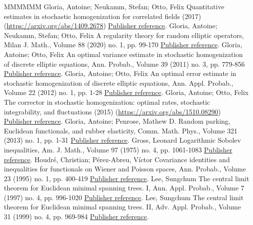 \begin{thebibliography}{MMMMMM}
 Gloria, Antoine; Neukamm, Stefan; Otto, Felix Quantitative estimates in stochastic homogenization for correlated fields (2017) (\url{https://arxiv.org/abs/1409.2678}) \href{https://ahl.centre-mersenne.org/item/AHL_2020__3__825_0/#GNO-quant}{Publisher reference}.
 Gloria, Antoine; Neukamm, Stefan; Otto, Felix A regularity theory for random elliptic operators, Milan J. Math., Volume 88 (2020) no. 1, pp. 99-170 \href{https://ahl.centre-mersenne.org/item/AHL_2020__3__825_0/#GNO-reg}{Publisher reference}.
 Gloria, Antoine; Otto, Felix An optimal variance estimate in stochastic homogenization of discrete elliptic equations, Ann. Probab., Volume 39 (2011) no. 3, pp. 779-856 \href{https://ahl.centre-mersenne.org/item/AHL_2020__3__825_0/#Glotto-11}{Publisher reference}.
 Gloria, Antoine; Otto, Felix An optimal error estimate in stochastic homogenization of discrete elliptic equations, Ann. Appl. Probab., Volume 22 (2012) no. 1, pp. 1-28 \href{https://ahl.centre-mersenne.org/item/AHL_2020__3__825_0/#Glotto-12}{Publisher reference}.
 Gloria, Antoine; Otto, Felix The corrector in stochastic homogenization: optimal rates, stochastic integrability, and fluctuations (2015) (\url{https://arxiv.org/abs/1510.08290}) \href{https://ahl.centre-mersenne.org/item/AHL_2020__3__825_0/#GO4}{Publisher reference}.
 Gloria, Antoine; Penrose, Mathew D. Random parking, Euclidean functionals, and rubber elasticity, Comm. Math. Phys., Volume 321 (2013) no. 1, pp. 1-31 \href{https://ahl.centre-mersenne.org/item/AHL_2020__3__825_0/#Gloria-Penrose-13}{Publisher reference}.
 Gross, Leonard Logarithmic Sobolev inequalities, Am. J. Math., Volume 97 (1975) no. 4, pp. 1061-1083 \href{https://ahl.centre-mersenne.org/item/AHL_2020__3__825_0/#Gross-75}{Publisher reference}.
 Houdré, Christian; Pérez-Abreu, Víctor Covariance identities and inequalities for functionals on Wiener and Poisson spaces, Ann. Probab., Volume 23 (1995) no. 1, pp. 400-419 \href{https://ahl.centre-mersenne.org/item/AHL_2020__3__825_0/#Houdre-PerezAbreu-95}{Publisher reference}.
 Lee, Sungchum The central limit theorem for Euclidean minimal spanning trees. I, Ann. Appl. Probab., Volume 7 (1997) no. 4, pp. 996-1020 \href{https://ahl.centre-mersenne.org/item/AHL_2020__3__825_0/#Lee-97}{Publisher reference}.
 Lee, Sungchum The central limit theorem for Euclidean minimal spanning trees. II, Adv. Appl. Probab., Volume 31 (1999) no. 4, pp. 969-984 \href{https://ahl.centre-mersenne.org/item/AHL_2020__3__825_0/#Lee-99}{Publisher reference}.

\end{thebibliography}
